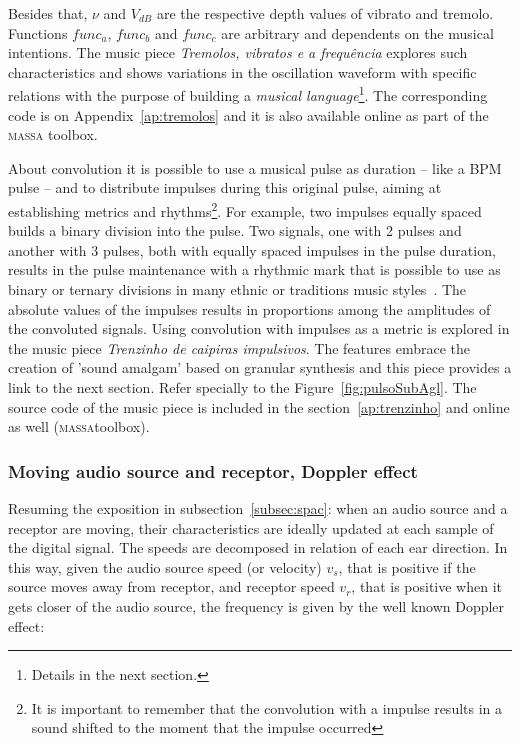 \documentclass[
 aip,
 jmp,
 amsmath,amssymb,
 reprint,
]{revtex4-1}
\newcommand{\massa}{{\large \textsc{massa}}}
\begin{document}
Besides that, $\nu$ and $V_{dB}$ are the respective depth values of vibrato and
tremolo. Functions $func_a$, $func_b$ and $func_c$ are arbitrary and dependents
on the musical intentions. The music piece \emph{Tremolos, vibratos e a
frequência} explores such characteristics and shows variations in the oscillation
waveform with specific relations with the purpose of building a \emph{musical
language}\footnote{Details in the next section.}. The corresponding code is on
Appendix~\ref{ap:tremolos} and it is also available online as part of the \massa
toolbox.

About convolution it is possible to use a musical pulse as duration -- like a BPM
pulse -- and to distribute impulses during this original pulse, aiming at
establishing metrics and rhythms\footnote{It is important to remember that the
convolution with a impulse results in a sound shifted to the moment that the
impulse occurred}.
For example, two impulses equally spaced builds a binary division into the
pulse. Two signals, one with 2 pulses and another with 3 pulses, both with
equally spaced impulses in the pulse duration, results in the pulse
maintenance with a rhythmic mark that is possible to use as binary or ternary
divisions in many ethnic or traditions music styles~\cite{Gramani}. 
The absolute values of the impulses results in proportions among the
amplitudes of the convoluted signals.
Using convolution with impulses as a metric is explored in the
music piece \emph{Trenzinho de caipiras impulsivos}. The features
embrace the creation of 'sound amalgam' based on granular synthesis and this
piece provides a link to the next section. Refer specially to the
Figure~\ref{fig:pulsoSubAgl}. The source code of the music piece is included in the section~\ref{ap:trenzinho} and online as well (\massa toolbox).

\subsubsection{Moving audio source and receptor, Doppler effect}

Resuming the exposition in subsection~\ref{subsec:spac}: when an audio source
and a receptor are moving, their characteristics are ideally updated at each
sample of the digital signal. The speeds are decomposed in relation of each ear
direction. In this way, given the audio source speed (or velocity) $v_s$, that
is positive if the source moves away from receptor, and receptor speed $v_r$,
that is positive when it gets closer of the audio source, the frequency is given
by the well known Doppler effect:
\end{document}
